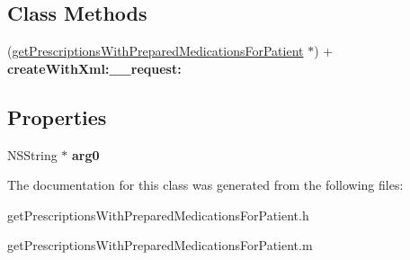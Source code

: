\subsection*{Class Methods}
\begin{DoxyCompactItemize}
\item 
\hypertarget{interfaceget_prescriptions_with_prepared_medications_for_patient_a971a9c20a0ac5c19dbc5e8da846957c0}{}(\hyperlink{interfaceget_prescriptions_with_prepared_medications_for_patient}{get\+Prescriptions\+With\+Prepared\+Medications\+For\+Patient} $\ast$) + {\bfseries create\+With\+Xml\+:\+\_\+\+\_\+request\+:}\label{interfaceget_prescriptions_with_prepared_medications_for_patient_a971a9c20a0ac5c19dbc5e8da846957c0}

\end{DoxyCompactItemize}
\subsection*{Properties}
\begin{DoxyCompactItemize}
\item 
\hypertarget{interfaceget_prescriptions_with_prepared_medications_for_patient_a4bce02e696baaace6ae3bbeaf6ba1420}{}N\+S\+String $\ast$ {\bfseries arg0}\label{interfaceget_prescriptions_with_prepared_medications_for_patient_a4bce02e696baaace6ae3bbeaf6ba1420}

\end{DoxyCompactItemize}


The documentation for this class was generated from the following files\+:\begin{DoxyCompactItemize}
\item 
get\+Prescriptions\+With\+Prepared\+Medications\+For\+Patient.\+h\item 
get\+Prescriptions\+With\+Prepared\+Medications\+For\+Patient.\+m\end{DoxyCompactItemize}
